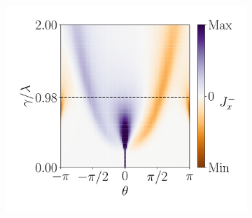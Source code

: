 \begin{figure}[h!]
\begin{minipage}[h!]{1\textwidth}
\begin{subfigure}[b!]{0.35 \textwidth}
             \label{}
         \end{subfigure}\hspace*{-0.5em}
         \begin{subfigure}[b!]{0.35 \textwidth}
             \caption{}
             \includegraphics[width=\textwidth]{Imagenes/Resultados_pump_Cuadrado/x/current_square_pump_negx.pdf}
             \label{}
         \end{subfigure}\hspace*{-0.5em}
     \end{minipage}\vspace*{-1em}
     

\end{figure}
